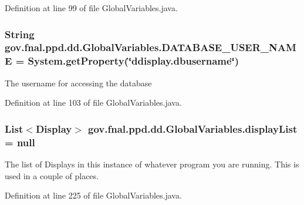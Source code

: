 Definition at line 99 of file Global\-Variables.\-java.

\hypertarget{classgov_1_1fnal_1_1ppd_1_1dd_1_1GlobalVariables_a1b5c1519d1964bf42b3fe4908ae6d444}{
\subsubsection[{D\-A\-T\-A\-B\-A\-S\-E\-\_\-\-U\-S\-E\-R\-\_\-\-N\-A\-M\-E}]{\setlength{\rightskip}{0pt plus 5cm}String gov.\-fnal.\-ppd.\-dd.\-Global\-Variables.\-D\-A\-T\-A\-B\-A\-S\-E\-\_\-\-U\-S\-E\-R\-\_\-\-N\-A\-M\-E = System.\-get\-Property(\char`\"{}ddisplay.\-dbusername\char`\"{})\hspace{0.3cm}{\ttfamily [static]}}}\label{classgov_1_1fnal_1_1ppd_1_1dd_1_1GlobalVariables_a1b5c1519d1964bf42b3fe4908ae6d444}
The username for accessing the database 

Definition at line 103 of file Global\-Variables.\-java.

\hypertarget{classgov_1_1fnal_1_1ppd_1_1dd_1_1GlobalVariables_a30efdc2ab60dd04f76dc1210b8447426}{
\subsubsection[{display\-List}]{\setlength{\rightskip}{0pt plus 5cm}List$<${\bf Display}$>$ gov.\-fnal.\-ppd.\-dd.\-Global\-Variables.\-display\-List = null\hspace{0.3cm}{\ttfamily [static]}}}\label{classgov_1_1fnal_1_1ppd_1_1dd_1_1GlobalVariables_a30efdc2ab60dd04f76dc1210b8447426}
The list of Displays in this instance of whatever program you are running. This is used in a couple of places. 

Definition at line 225 of file Global\-Variables.\-java.

